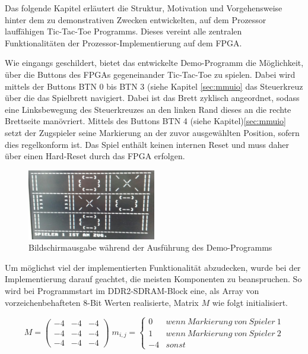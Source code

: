 
Das folgende Kapitel erläutert die Struktur, Motivation und Vorgehensweise hinter dem zu demonstrativen Zwecken entwickelten, auf dem Prozessor lauffähigen Tic-Tac-Toe Programms. Dieses vereint alle zentralen Funktionalitäten der Prozessor-Implementierung auf dem FPGA.


Wie eingangs geschildert, bietet das entwickelte Demo-Programm die Möglichkeit, über die Buttons des FPGAs gegeneinander Tic-Tac-Toe zu spielen. Dabei wird mittels der Buttons BTN 0 bis BTN 3 (siehe Kapitel \ref{sec:mmuio} das Steuerkreuz über die das Spielbrett navigiert. Dabei ist das Brett zyklisch angeordnet, sodass eine Linksbewegung des Steuerkreuzes an den linken Rand dieses an die rechte Brettseite manövriert. Mittels des Buttons BTN 4 (siehe Kapitel)\ref{sec:mmuio} setzt der Zugspieler seine Markierung an der zuvor ausgewählten Position, sofern dies regelkonform ist. Das Spiel enthält keinen internen Reset und muss daher über einen Hard-Reset durch das FPGA erfolgen.

\begin{figure}[H]
	\centering
		\includegraphics[width=0.5\textwidth]{gameplay.png}
	\caption{Bildschirmausgabe w\"ahrend der Ausf\"uhrung des Demo-Programms}
	\label{fig:gameplay}
\end{figure}

Um möglichst viel der implementierten Funktionalität abzudecken, wurde bei der Implementierung darauf geachtet, die meisten Komponenten zu beanspruchen. So wird bei Programmstart im DDR2-SDRAM-Block eine, als Array von vorzeichenbehafteten 8-Bit Werten realisierte, Matrix $M$ wie folgt initialisiert.

\[ M = \begin{pmatrix} -4 & -4 & -4\\ -4 & -4 & -4\\ -4 & -4 & -4  \end{pmatrix}\;
 m_{i,j} = \begin{cases}
	0 & wenn\:Markierung\:von\:Spieler\:1 \\
	1 & wenn\:Markierung\:von\:Spieler\:2 \\
	-4 & sonst

\end{cases}\]

